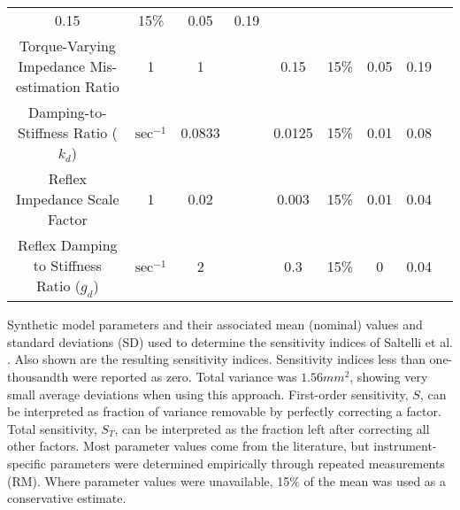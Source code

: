 \begin{table}[!ht]
\begin{tabular}{|c|c|c c|c c|c c|c|}
0.15 &
15\% &
0.05 &
0.19 \\
Torque-Varying Impedance Mis-estimation Ratio &
1 &
1 &
\cite{burdet2006stability} &
0.15 &
15\% &
0.05 &
0.19 \\
Damping-to-Stiffness Ratio ($k_d$) &
$\text{sec}^{-1}$ &
0.0833 &
\cite{burdet2006stability} &
0.0125 &
15\% &
0.01 &
0.08 \\
Reflex Impedance Scale Factor &
1 &
0.02 &
\cite{burdet2006stability} &
0.003 &
15\% &
0.01 &
0.04 \\
Reflex Damping to Stiffness Ratio ($g_d$) &
$\text{sec}^{-1}$ &
2 &
\cite{burdet2006stability} &
0.3 &
15\% &
0 &
0.04 \\ \hline
\end{tabular}
\begin{flushleft}Synthetic model parameters and their associated mean (nominal) values and standard deviations (SD) used to determine the sensitivity indices of Saltelli et al. \cite{saltelli2010variance}. Also shown are the resulting sensitivity indices. Sensitivity indices less than one-thousandth were reported as zero. Total variance was $1.56 mm^2$, showing very small average deviations when using this approach. First-order sensitivity, $S$, can be interpreted as fraction of variance removable by perfectly correcting a factor. Total sensitivity, $S_T$, can be interpreted as the fraction left after correcting all other factors. Most parameter values come from the literature, but instrument-specific parameters were determined empirically through repeated measurements (RM). Where parameter values were unavailable, 15\% of the mean was used as a conservative estimate.
\end{flushleft}
\label{tab:parameters}
\end{table}

%
% 



